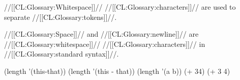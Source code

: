\endsubsubsubsection%

\endsubsubsection%


//[[CL:Glossary:Whitespace]]// //[[CL:Glossary:characters]]// are used to separate //[[CL:Glossary:tokens]]//.

//[[CL:Glossary:Space]]// and //[[CL:Glossary:newline]]// are //[[CL:Glossary:whitespace]]// //[[CL:Glossary:characters]]//
in //[[CL:Glossary:standard syntax]]//.


\code
 (length '(this-that)) 
 (length '(this - that)) 
 (length '(a
           b)) 
 (+ 34) 
 (+ 3 4) 
\endcode

\endsubsubsubsection%

\endsubsubsection%

\endSubsection%
